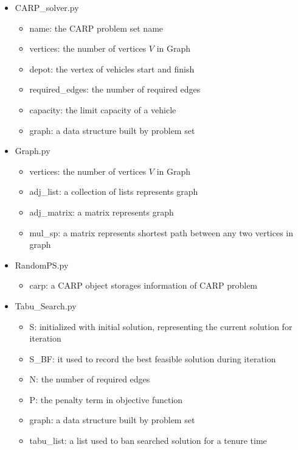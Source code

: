 \documentclass[conference,compsoc]{IEEEtran}
\begin{document}
\begin{itemize}
	\item CARP\_solver.py
	\begin{itemize}
		\item name: the CARP problem set name
		\item vertices: the number of vertices $V$ in Graph
		\item depot: the vertex of vehicles start and finish 
		\item required\_edges: the number of required edges
		\item capacity: the limit capacity of a vehicle 
		\item graph: a data structure built by problem set
	\end{itemize}
	\item Graph.py
	\begin{itemize}
		\item vertices: the number of vertices $V$ in Graph
		\item adj\_list: a collection of lists represents graph
		\item adj\_matrix: a matrix represents graph
		\item mul\_sp: a matrix represents shortest path between any two vertices in graph
	\end{itemize}
	\item RandomPS.py
	\begin{itemize}
		\item carp: a CARP object storages information of CARP problem 
	\end{itemize}
	\item Tabu\_Search.py
	\begin{itemize}
		\item S: initialized with initial solution, representing the current solution for iteration
		\item S\_BF: it used to record the best feasible solution during iteration
		\item N: the number of required edges
		\item P: the penalty term in objective function
		\item graph: a data structure built by problem set
		\item tabu\_list: a list used to ban searched solution for a tenure time
	\end{itemize}
	
\end{itemize}
\end{document}
